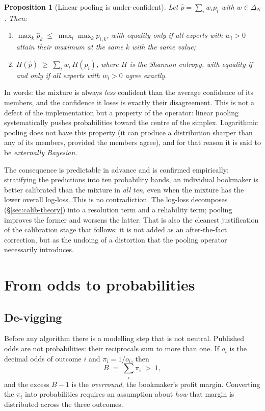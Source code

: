 \documentclass[12pt,a4paper,oneside]{report}
\renewcommand{\_}{\oldunderscore\allowbreak}
\theoremstyle{definition}
\theoremstyle{plain}
\newtheorem{proposition}[theorem]{Proposition}
\theoremstyle{remark}
\begin{document}
\begin{proposition}[Linear pooling is under-confident]
\label{prop:pooling-shrinks}
Let $\hat{p} = \sum_i w_i p_i$ with $w \in \Delta_N$. Then:
\begin{enumerate}[label=(\alph*),topsep=3pt]
  \item $\max_k \hat{p}_k \;\leq\; \max_i \max_k p_{i,k}$, with equality only if all experts
        with $w_i>0$ attain their maximum at the same $k$ with the same value;
  \item $H(\hat{p}) \;\geq\; \sum_i w_i\, H(p_i)$, where $H$ is the Shannon entropy, with
        equality if and only if all experts with $w_i>0$ agree exactly.
\end{enumerate}
\end{proposition}

In words: the mixture is always \emph{less} confident than the average confidence of its
members, and the confidence it loses is exactly their disagreement. This is not a defect of the
implementation but a property of the operator: linear pooling systematically pushes
probabilities toward the centre of the simplex. Logarithmic pooling does not have this
property (it can produce a distribution sharper than any of its members, provided the members
agree), and for that reason it is said to be \emph{externally Bayesian}.

The consequence is predictable in advance and is confirmed empirically: stratifying the
predictions into ten probability bands, an individual bookmaker is better calibrated than the
mixture in \emph{all ten}, even when the mixture has the lower overall log-loss. This is no
contradiction. The log-loss decomposes (\S\ref{sec:calib-theory}) into a resolution term and a
reliability term; pooling improves the former and worsens the latter. That is also the cleanest
justification of the calibration stage that follows: it is not added as an after-the-fact
correction, but as the undoing of a distortion that the pooling operator necessarily
introduces.

\section{From odds to probabilities}

\subsection{De-vigging}
\label{sec:devig-theory}

Before any algorithm there is a modelling step that is not neutral. Published odds are not
probabilities: their reciprocals sum to more than one. If $o_i$ is the decimal odds of outcome
$i$ and $\pi_i = 1/o_i$, then
\[
B \;=\; \sum_{i} \pi_i \;>\; 1,
\]
and the excess $B-1$ is the \emph{overround}, the bookmaker's profit margin. Converting the
$\pi_i$ into probabilities requires an assumption about \emph{how} that margin is distributed
across the three outcomes.
\end{document}
